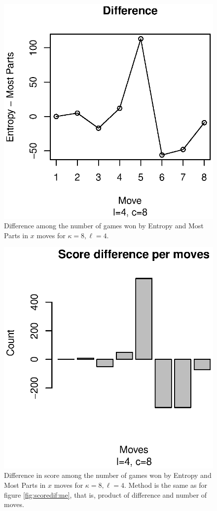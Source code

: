 \documentclass[preprint,12pt]{elsarticle}
\begin{document}
\begin{figure}[!htb]
\centering
\includegraphics{dif-48.eps}
\caption{Difference among the number of games won by Entropy and Most
  Parts in $x$ moves for  $\kappa=8, \ell=4$. \label{fig:dif:me:48}}
\end{figure} 
%
\begin{figure}[!htb]
\centering
\includegraphics{score-dif-48.eps}
\caption{Difference in score among the number of games won by Entropy and Most
  Parts in $x$ moves for  $\kappa=8, \ell=4$. Method is the same as
  for figure \ref{fig:scoredif:me}, that is, product of difference and
  number of moves. \label{fig:scoredif:me:48}}
\end{figure}
%
\end{document}
